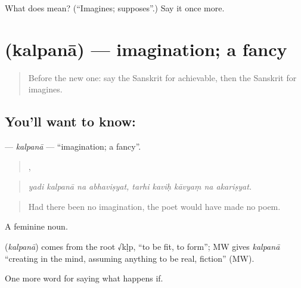 \begin{tcolorbox}[breakable,colback=teal!4,colframe=teal!35!black,title={Before you move on}]
What does  mean? (\textquotedblleft{}Imagines; supposes\textquotedblright{}.) Say it once more.
\end{tcolorbox}
\section[\texorpdfstring{\sk{कल्पना} (kalpanā)}{कल्पना (kalpanā)}]{ (kalpanā) — imagination; a fancy}

\label{lesson:SA-C389-kalpana}



\begin{quote}
Before the new one: say the Sanskrit for achievable, then the Sanskrit for imagines.
\end{quote}

\subsection*{You'll want to know: }
\textbf{} — \emph{kalpanā} — \textquotedblleft{}imagination; a fancy\textquotedblright{}.

\begin{quote}
   ,     
\end{quote}

\begin{quote}
\emph{yadi kalpanā na abhaviṣyat, tarhi kaviḥ kāvyaṃ na akariṣyat.}
\end{quote}

\begin{quote}
Had there been no imagination, the poet would have made no poem.
\end{quote}

A feminine noun.

\begin{cousinweb}
\textbf{} (\emph{kalpanā}) comes from the root √kḷp, \textquotedblleft{}to be fit, to form\textquotedblright{}; MW gives \emph{kalpanā} \textquotedblleft{}creating in the mind, assuming anything to be real, fiction\textquotedblright{} (MW).
\end{cousinweb}

\begin{grammarlens}[title={What you've built}]
One more word for saying what happens if.
\end{grammarlens}

